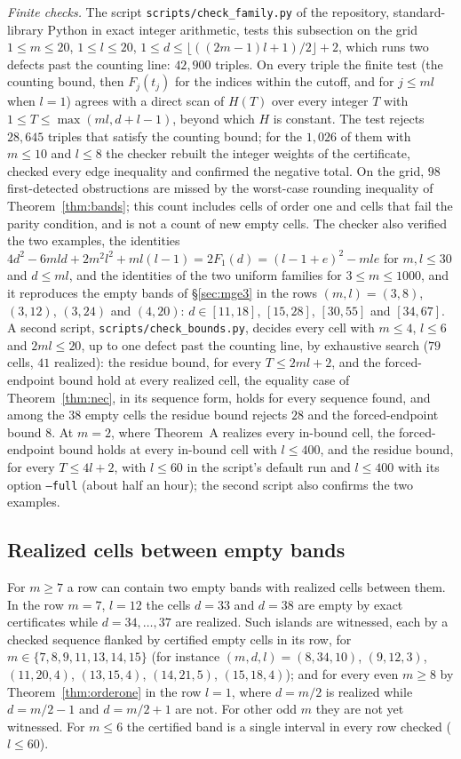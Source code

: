 \documentclass[11pt]{amsart}
\theoremstyle{plain}
\theoremstyle{definition}
\theoremstyle{remark}
\begin{document}
\emph{Finite checks.} The script \texttt{scripts/check\_family.py} of the repository, standard-library
Python in exact integer arithmetic, tests this subsection on the grid $1 \le m \le 20$, $1 \le l \le 20$,
$1 \le d \le \lfloor ((2m-1)l+1)/2 \rfloor + 2$, which runs two defects past the counting
line: $42{,}900$ triples. On every triple the finite test (the counting bound, then
$F_j(t_j)$ for the indices within the cutoff, and for $j \le ml$ when $l = 1$) agrees with a direct scan of $H(T)$ over
every integer $T$ with $1 \le T \le \max(ml, d+l-1)$, beyond which $H$ is constant. The
test rejects $28{,}645$ triples that satisfy the counting bound; for the $1{,}026$ of them
with $m \le 10$ and $l \le 8$ the checker rebuilt the integer weights of the certificate,
checked every edge inequality and confirmed the negative total. On the grid, $98$
first-detected obstructions are missed by the worst-case rounding inequality of
Theorem~\ref{thm:bands}; this count includes cells of order one and cells that fail the
parity condition, and is not a count of new empty cells. The checker also verified the
two examples, the identities $4d^2 - 6mld + 2m^2l^2 + ml(l-1) = 2F_1(d) = (l-1+e)^2 - mle$
for $m, l \le 30$ and $d \le ml$, and the identities of the two uniform families for
$3 \le m \le 1000$, and it reproduces the empty bands of \S\ref{sec:mge3} in the rows
$(m,l) = (3,8)$, $(3,12)$, $(3,24)$ and $(4,20)$: $d \in [11,18]$, $[15,28]$, $[30,55]$
and $[34,67]$. A second script, \texttt{scripts/check\_bounds.py}, decides every cell with $m \le 4$, $l \le 6$ and
$2ml \le 20$, up to one defect past the counting line, by exhaustive search ($79$ cells,
$41$ realized): the
residue bound, for every $T \le 2ml + 2$, and the forced-endpoint bound hold at every
realized cell, the equality case of Theorem~\ref{thm:nec}, in its sequence form, holds
for every sequence found, and among the $38$ empty cells the residue bound rejects $28$ and
the forced-endpoint bound $8$. At $m = 2$, where Theorem~A realizes every in-bound cell,
the forced-endpoint bound holds at every in-bound cell with $l \le 400$, and the residue bound,
for every $T \le 4l + 2$, with $l \le 60$ in the script's default run and $l \le 400$ with its
option \texttt{--full} (about half an hour); the second script also confirms the two examples.

\subsection*{Realized cells between empty bands}
For $m \ge 7$ a row can contain two empty bands with realized cells between them. In the
row $m = 7$, $l = 12$ the cells $d = 33$ and $d = 38$ are empty by exact certificates
while $d = 34,\dots,37$ are realized. Such islands are witnessed, each by a checked
sequence flanked by certified empty cells in its row, for
$m \in \{7,8,9,11,13,14,15\}$ (for instance $(m,d,l) = (8,34,10)$, $(9,12,3)$,
$(11,20,4)$, $(13,15,4)$, $(14,21,5)$, $(15,18,4)$); and for every even $m \ge 8$ by
Theorem~\ref{thm:orderone} in the row $l = 1$, where $d = m/2$ is realized while
$d = m/2 - 1$ and $d = m/2 + 1$ are not. For other odd $m$ they are not yet witnessed.
For $m \le 6$ the certified band is a single interval in every row checked ($l \le 60$).
\end{document}
